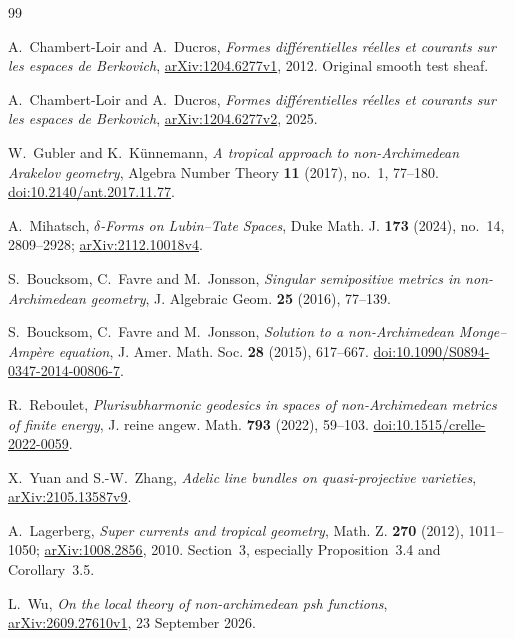 \documentclass[11pt,a4paper]{article}
\theoremstyle{definition}
\theoremstyle{remark}
\numberwithin{equation}{section}
\begin{document}
\begin{thebibliography}{99}
\raggedright

A.~Chambert-Loir and A.~Ducros,
\emph{Formes diff\'erentielles r\'eelles et courants sur les espaces de
Berkovich}, \href{https://arxiv.org/abs/1204.6277v1}{arXiv:1204.6277v1},
2012.  Original smooth test sheaf.

A.~Chambert-Loir and A.~Ducros,
\emph{Formes diff\'erentielles r\'eelles et courants sur les espaces de
Berkovich}, \href{https://arxiv.org/abs/1204.6277v2}{arXiv:1204.6277v2},
2025.

W.~Gubler and K.~K\"unnemann,
\emph{A tropical approach to non-Archimedean Arakelov geometry},
Algebra Number Theory \textbf{11} (2017), no.~1, 77--180.
\href{https://doi.org/10.2140/ant.2017.11.77}{doi:10.2140/ant.2017.11.77}.

A.~Mihatsch, \emph{$\delta$-Forms on Lubin--Tate Spaces},
Duke Math. J. \textbf{173} (2024), no.~14, 2809--2928;
\href{https://arxiv.org/abs/2112.10018v4}{arXiv:2112.10018v4}.

S.~Boucksom, C.~Favre and M.~Jonsson,
\emph{Singular semipositive metrics in non-Archimedean geometry},
J. Algebraic Geom. \textbf{25} (2016), 77--139.

S.~Boucksom, C.~Favre and M.~Jonsson,
\emph{Solution to a non-Archimedean Monge--Amp\`ere equation},
J. Amer. Math. Soc. \textbf{28} (2015), 617--667.
\href{https://doi.org/10.1090/S0894-0347-2014-00806-7}{doi:10.1090/S0894-0347-2014-00806-7}.

R.~Reboulet,
\emph{Plurisubharmonic geodesics in spaces of non-Archimedean metrics
of finite energy}, J. reine angew. Math. \textbf{793} (2022), 59--103.
\href{https://doi.org/10.1515/crelle-2022-0059}{doi:10.1515/crelle-2022-0059}.

X.~Yuan and S.-W.~Zhang,
\emph{Adelic line bundles on quasi-projective varieties},
\href{https://arxiv.org/abs/2105.13587v9}{arXiv:2105.13587v9}.

A.~Lagerberg, \emph{Super currents and tropical geometry},
Math. Z. \textbf{270} (2012), 1011--1050;
\href{https://arxiv.org/abs/1008.2856}{arXiv:1008.2856}, 2010.
Section~3, especially Proposition~3.4 and Corollary~3.5.

L.~Wu, \emph{On the local theory of non-archimedean psh functions},
\href{https://arxiv.org/abs/2609.27610v1}{arXiv:2609.27610v1},
23 September 2026.


\end{thebibliography}
\end{document}
